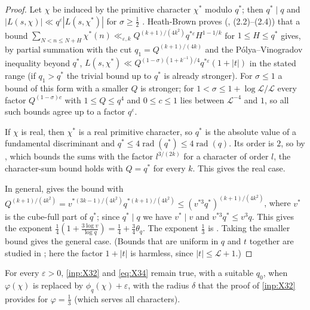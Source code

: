 \documentclass[11pt]{amsart}
\numberwithin{equation}{section}
\theoremstyle{plain}
\theoremstyle{definition}
\theoremstyle{remark}
\newcommand{\LL}{\mathcal{L}}
\newcommand{\eps}{\varepsilon}
\newcommand{\1}{\mathbf{1}}
\begin{document}
\begin{proof}
Let $\chi$ be induced by the primitive character $\chi^*$ modulo $q^*$; then $q^*\mid q$ and
$|L(s,\chi)|\ll q^\eps|L(s,\chi^*)|$ for $\sigma\ge\frac12$ \cite[p.~10]{HeathBrown1992zero}. Heath-Brown
proves (\cite[pp.~9--10]{HeathBrown1992zero}, (2.2)--(2.4)) that a bound
$\sum_{N<n\le N+H}\chi^*(n)\ll_{\eps,k}Q^{(k+1)/(4k^2)}q^{*\eps}H^{1-1/k}$ for $1\le H\le q^*$ gives, by partial
summation with the cut $q_1=Q^{(k+1)/(4k)}$ and the P\'olya--Vinogradov inequality beyond $q^*$,
$L(s,\chi^*)\ll Q^{(1-\sigma)(1+k^{-1})/4}q^{*\eps}(1+|t|)$ in the stated range (if $q_1>q^*$ the trivial
bound up to $q^*$ is already stronger). For $\sigma\le1$ a bound of this form with a smaller $Q$ is
stronger; for $1<\sigma\le1+\log\LL/\LL$ every factor $Q^{(1-\sigma)c}$ with $1\le Q\le q^4$ and
$0\le c\le1$ lies between $\LL^{-4}$ and $1$, so all such bounds agree up to a factor $q^{\eps}$.

If $\chi$ is real, then $\chi^*$ is a real primitive character, so $q^*$ is the absolute value of a
fundamental discriminant and $q^*\le4\operatorname{rad}(q^*)\le4\operatorname{rad}(q)$. Its order is $2$, so by \cite[Lemma~2.4]{HeathBrown1992zero}, which bounds the
sums with the factor $l^{3/(2k)}$ for a character of order $l$, the character-sum bound holds with
$Q=q^*$ for every $k$. This gives the real case.

In general, \cite[Lemma~2.3]{HeathBrown1992zero} gives the bound with
$Q^{(k+1)/(4k^2)}=v^{*(3k-1)/(4k^2)}q^{*(k+1)/(4k^2)}\le(v^{*3}q^*)^{(k+1)/(4k^2)}$, where $v^*$ is the
cube-full part of $q^*$; since $q^*\mid q$ we have $v^*\mid v$ and $v^{*3}q^*\le v^3q$. This gives the
exponent $\frac14(1+\frac{3\log v}{\log q})=\frac14+\frac34\theta_q$. The exponent $\frac13$ is
\cite[Lemma~2.5]{HeathBrown1992zero}. Taking the smaller bound gives the general case. (Bounds that are uniform in $q$ and $t$
together are studied in \cite{HeathBrown1978hybrid}; here the factor $1+|t|$ is harmless, since
$|t|\le\LL+1$.)
\end{proof}

\begin{lemma}\label{lem:explicitphi}
For every $\eps>0$, \cref{inp:X32} and \eqref{eq:X34} remain true, with a suitable $q_0$, when $\varphi(\chi)$ is replaced by
$\phi_q(\chi)+\eps$, with the radius $\delta$ that the proof of \cref{inp:X32} provides for $\varphi=\frac13$ (which
serves all characters).
\end{lemma}
\end{document}
